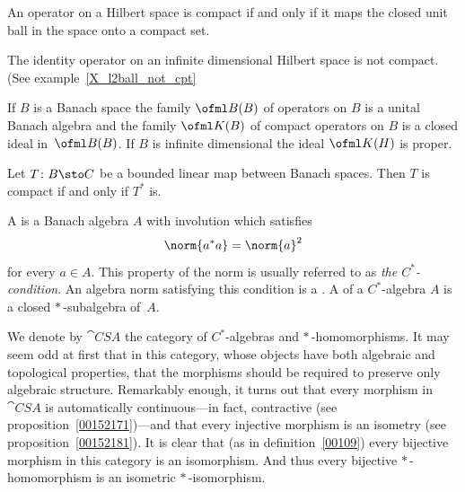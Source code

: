\begin{prop} An operator on a Hilbert space is compact if and only if it maps the closed unit ball in the space
onto a compact set.
\end{prop}

\begin{cor}\label{cor_id_op_not_cpt} The identity operator on an infinite dimensional Hilbert space is not compact.
(See example~\ref{X_l2ball_not_cpt}
\end{cor}

\begin{exam} If $B$ is a Banach space the family $\ofml B(B)$ of operators on $B$ is a
unital Banach algebra and the
family $\ofml K(B)$ of compact operators on $B$ is a closed ideal in~$\ofml B(B)$.
If $B$ is infinite dimensional the ideal $\ofml K(H)$ is proper.
\end{exam}

\begin{prop} Let $T\colon B \sto C$ be a bounded linear map between Banach spaces. Then $T$ is compact
if and only if $T^*$ is.
\end{prop}

\begin{defn}\label{0013} A
 is a Banach algebra $A$ with involution which satisfies
   \[ \norm{a^*a} = \norm{a}^2 \]
for every $a \in A$.  This property of the norm is usually referred to as
\emph{the $C^*$-condition}. An algebra norm satisfying this condition is a
.  A
 of a $C^*$-algebra $A$ is a closed $*\,$-subalgebra of~$A$.

We denote by $\cat{CSA}$ the category of $C^*$-algebras and $*\,$-homomorphisms.
It may seem odd at first that in this category, whose objects have both algebraic and topological properties,
that the morphisms should be required to preserve only algebraic structure.  Remarkably enough, it turns out
that every morphism in $\cat{CSA}$ is automatically continuous---in fact, contractive (see
proposition~\ref{00152171})---and that
every injective morphism is an isometry (see proposition~\ref{00152181}).  It is clear that
(as in definition~\ref{00109}) every bijective morphism in this category is an isomorphism.  And thus every bijective $*\,$-homomorphism
is an isometric $*\,$-isomorphism.
\end{defn}


